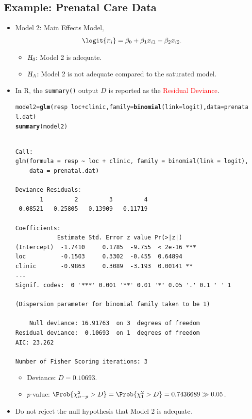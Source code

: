 \documentclass[oneside]{book}\usepackage[]{graphicx}\usepackage[svgnames]{xcolor}
\makeatletter
\newcommand{\hlopt}[1]{\textcolor[rgb]{0,0,0}{#1}}%
\newcommand{\hlstd}[1]{\textcolor[rgb]{0.345,0.345,0.345}{#1}}%
\newcommand{\hlkwb}[1]{\textcolor[rgb]{0.69,0.353,0.396}{#1}}%
\newcommand{\hlkwc}[1]{\textcolor[rgb]{0.333,0.667,0.333}{#1}}%
\newcommand{\hlkwd}[1]{\textcolor[rgb]{0.737,0.353,0.396}{\textbf{#1}}}%
\newenvironment{kframe}{%
 \def\at@end@of@kframe{}%
 \ifinner\ifhmode%
  \def\at@end@of@kframe{\end{minipage}}%
  \begin{minipage}{\columnwidth}%
 \fi\fi%
 \def\FrameCommand##1{\hskip\@totalleftmargin \hskip-\fboxsep
 \colorbox{shadecolor}{##1}\hskip-\fboxsep
     \hskip-\linewidth \hskip-\@totalleftmargin \hskip\columnwidth}%
 \MakeFramed {\advance\hsize-\width
   \@totalleftmargin\z@ \linewidth\hsize
   \@setminipage}}%
 {\par\unskip\endMakeFramed%
 \at@end@of@kframe}
\newenvironment{knitrout}{}{} %
\newcommand{\HN}{\textsl{H}_{\textsl{0}}}%
\newcommand{\HA}{\textsl{H}_{\textsl{A}}}%
\makeatother
\begin{document}
\subsection*{Example: Prenatal Care Data}
\begin{itemize}
      \item Model 2: Main Effects Model,
            \[ \logit{\pi_i}=\beta_0+\beta_1x_{i1}+\beta_2x_{i2}. \]
            \begin{itemize}
                  \item $ \HN $: Model 2 is adequate.
                  \item $ \HA $: Model 2 is not adequate compared to the saturated model.
            \end{itemize}
      \item In R, the \texttt{summary()} output $ D $ is reported as the \textcolor{Red}{Residual Deviance}.
\begin{knitrout}
\color{fgcolor}\begin{kframe}
\begin{alltt}
\hlstd{model2} \hlkwb{=} \hlkwd{glm}\hlstd{(resp} \hlopt{~} \hlstd{loc} \hlopt{+} \hlstd{clinic,} \hlkwc{family} \hlstd{=} \hlkwd{binomial}\hlstd{(}\hlkwc{link} \hlstd{= logit),} \hlkwc{data} \hlstd{= prenatal.dat)}
\hlkwd{summary}\hlstd{(model2)}
\end{alltt}
\begin{verbatim}

Call:
glm(formula = resp ~ loc + clinic, family = binomial(link = logit), 
    data = prenatal.dat)

Deviance Residuals: 
       1         2         3         4  
-0.08521   0.25805   0.13909  -0.11719  

Coefficients:
            Estimate Std. Error z value Pr(>|z|)    
(Intercept)  -1.7410     0.1785  -9.755  < 2e-16 ***
loc          -0.1503     0.3302  -0.455  0.64894    
clinic       -0.9863     0.3089  -3.193  0.00141 ** 
---
Signif. codes:  0 '***' 0.001 '**' 0.01 '*' 0.05 '.' 0.1 ' ' 1

(Dispersion parameter for binomial family taken to be 1)

    Null deviance: 16.91763  on 3  degrees of freedom
Residual deviance:  0.10693  on 1  degrees of freedom
AIC: 23.262

Number of Fisher Scoring iterations: 3
\end{verbatim}
\end{kframe}
\end{knitrout}
            \begin{itemize}
                  \item Deviance: $ D=0.10693 $.
                  \item $ p $-value: $ \Prob{\chi^2_{n-p}>D}=\Prob{\chi^2_1>D}=0.7436689\gg 0.05 $.
            \end{itemize}
      \item Do not reject the null hypothesis that Model 2 is adequate.
\end{itemize}
\end{document}
